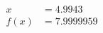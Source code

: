 \documentclass[preview]{standalone}
\begin{document}
\begin{align*}
x &= 4.9943\\f(x) &= 7.9999959
\end{align*}
\end{document}

